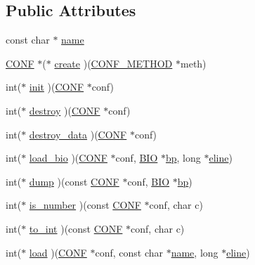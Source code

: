 \subsection*{Public Attributes}
\begin{DoxyCompactItemize}
\item 
const char $\ast$ \hyperlink{structconf__method__st_a3349eb0f994901012106e16ffbba7a19}{name}
\item 
\hyperlink{ossl__typ_8h_a22bfdc2f19c31f1ec7bd6d807aeb68d2}{C\+O\+NF} $\ast$($\ast$ \hyperlink{structconf__method__st_a11f5d812406f403c32ae2b99bb5aae5e}{create} )(\hyperlink{conf_8h_a8e1c42b09eb2fde768c3a90e8338a6ea}{C\+O\+N\+F\+\_\+\+M\+E\+T\+H\+OD} $\ast$meth)
\item 
int($\ast$ \hyperlink{structconf__method__st_af4c92d4cdeff7ceecd0b523201722c1c}{init} )(\hyperlink{ossl__typ_8h_a22bfdc2f19c31f1ec7bd6d807aeb68d2}{C\+O\+NF} $\ast$conf)
\item 
int($\ast$ \hyperlink{structconf__method__st_a9b4f45995dd4fd551e4586aa41ed370e}{destroy} )(\hyperlink{ossl__typ_8h_a22bfdc2f19c31f1ec7bd6d807aeb68d2}{C\+O\+NF} $\ast$conf)
\item 
int($\ast$ \hyperlink{structconf__method__st_ac68ecdd9bc4dd2cbca6379ae13fd6335}{destroy\+\_\+data} )(\hyperlink{ossl__typ_8h_a22bfdc2f19c31f1ec7bd6d807aeb68d2}{C\+O\+NF} $\ast$conf)
\item 
int($\ast$ \hyperlink{structconf__method__st_a2a0369109a541d85263dc5ce24060a1a}{load\+\_\+bio} )(\hyperlink{ossl__typ_8h_a22bfdc2f19c31f1ec7bd6d807aeb68d2}{C\+O\+NF} $\ast$conf, \hyperlink{bio_8h_af3fabae1c9af50b9312cdff41e11d1dd}{B\+IO} $\ast$\hyperlink{conf_8h_a8f12a78fdc053e4143bc0896f8b3d937}{bp}, long $\ast$\hyperlink{conf_8h_a3684aa00620e99a7cff598ed9a846da3}{eline})
\item 
int($\ast$ \hyperlink{structconf__method__st_a20d82ae26d815bfc82ac54720d867cb9}{dump} )(const \hyperlink{ossl__typ_8h_a22bfdc2f19c31f1ec7bd6d807aeb68d2}{C\+O\+NF} $\ast$conf, \hyperlink{bio_8h_af3fabae1c9af50b9312cdff41e11d1dd}{B\+IO} $\ast$\hyperlink{conf_8h_a8f12a78fdc053e4143bc0896f8b3d937}{bp})
\item 
int($\ast$ \hyperlink{structconf__method__st_a696db4ab9f125a3ccd0c12da8a182cb0}{is\+\_\+number} )(const \hyperlink{ossl__typ_8h_a22bfdc2f19c31f1ec7bd6d807aeb68d2}{C\+O\+NF} $\ast$conf, char c)
\item 
int($\ast$ \hyperlink{structconf__method__st_afa9903c936cd9de9822cc65f4fe0b34f}{to\+\_\+int} )(const \hyperlink{ossl__typ_8h_a22bfdc2f19c31f1ec7bd6d807aeb68d2}{C\+O\+NF} $\ast$conf, char c)
\item 
int($\ast$ \hyperlink{structconf__method__st_a27a9c46f51b45cebe7401e2e0d2beb3c}{load} )(\hyperlink{ossl__typ_8h_a22bfdc2f19c31f1ec7bd6d807aeb68d2}{C\+O\+NF} $\ast$conf, const char $\ast$\hyperlink{structconf__method__st_a3349eb0f994901012106e16ffbba7a19}{name}, long $\ast$\hyperlink{conf_8h_a3684aa00620e99a7cff598ed9a846da3}{eline})
\end{DoxyCompactItemize}


